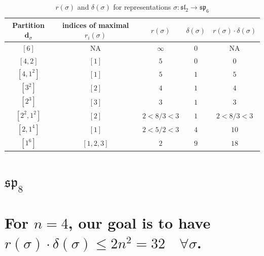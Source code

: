 \documentclass{article}%
\begin{document}
    \begin{center}
    \label{table:sp_6}
    \begin{longtable}{||c|c|c|c|c||}
    \caption{$r(\sigma)$ and $\delta(\sigma)$ for representations $\sigma: \mathfrak{sl}_2 \to \mathfrak{sp}_{6}$}
    \hline
    Partition $\textbf{d}_\sigma$
    &indices of maximal $r_i(\sigma)$
    &$r(\sigma)$
    &$\delta(\sigma)$
    &$r(\sigma) \cdot \delta(\sigma)$
    \\ [0.3ex] \hline\endhead
    $[6]$ & NA & $\infty$ & $0$ & NA \\ \hline 
$[4, 2]$ & $[1]$ & $5$ & $0$ & $0$ \\ \hline 
$[4, 1^{2}]$ & $[1]$ & $5$ & $1$ & $5$ \\ \hline 
$[3^{2}]$ & $[2]$ & $4$ & $1$ & $4$ \\ \hline 
$[2^{3}]$ & $[3]$ & $3$ & $1$ & $3$ \\ \hline 
$[2^{2}, 1^{2}]$ & $[2]$ & $2 < 8/3 < 3$ & $1$ & $2 < 8/3 < 3$ \\ \hline 
$[2, 1^{4}]$ & $[1]$ & $2 < 5/2 < 3$ & $4$ & $10$ \\ \hline 
$[1^{6}]$ & $[1, 2, 3]$ & $2$ & $9$ & $18$ \\ \hline 
    \end{longtable}
    \end{center}
\newpage

%
\section{$\mathfrak{sp}_{8}$}%
\section*{For $n=4$, our goal is to have $r(\sigma) \cdot \delta(\sigma) \leq 2n^2 = 32 \quad \forall \sigma$.}%

%
\linebreak%
\end{document}
